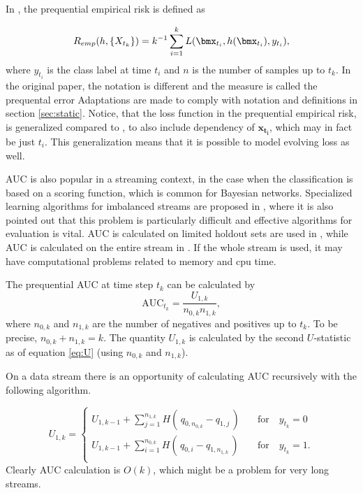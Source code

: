 In \cite{Gam13}, the prequential empirical risk is defined as 

\begin{equation}
\label{eq:prequentialRisk}
R_{emp}(h, \{X_{t_k}\}) = k^{-1} \sum_{i=1}^k L(\bmx_{t_i} , h(\bmx_{t_i} ), y_{t_i}),
\end{equation}
where $y_{t_i}$ is the class label at time $t_i$ and $n$ is the number of samples up to $t_k$.  In the original paper, the notation is different and the measure is called the prequental error  Adaptations are made to comply with notation and definitions in section \ref{sec:static}.  Notice, that the loss function in the prequential empirical risk, is generalized compared to \cite{Gam13}, to also include dependency of $\bm{x_{t_i}}$, which may in fact be just $t_i$.  This generalization means that it is possible to model evolving loss as well.


AUC is also popular in a streaming context, in the case when the classification is based on a scoring function, which is common for Bayesian networks. 
Specialized learning algorithms for imbalanced streams are proposed in \cite{Dit13, Hoe12, Lic10}, where it is also pointed out that this problem is particularly difficult and effective algorithms for evaluation is vital.  
AUC is calculated on limited holdout sets are used in  \cite{Dit13, Lic10}, while AUC is calculated on the entire stream in  \cite{Hoe12}. If the whole stream is used, it may have computational problems related to memory and cpu time.  

The prequential AUC at time step $t_k$ can be calculated by
\begin{equation}
\label{eq:prequentialAUC}
\mbox{AUC}_{t_k}= \frac{U_{1,k}}{n_{0,k}n_{1,k}},
\end{equation}
where $n_{0,k}$ and $n_{1,k}$ are the number of negatives and positives up to $t_k$.  To be precise, $n_{0,k} + n_{1,k} = k$.  The quantity $U_{1,k}$ is calculated by the second $U$-statistic as of equation \eqref{eq:U} (using $n_{0,k}$ and $n_{1,k}$).

On a data stream there is an opportunity of calculating AUC recursively with the following algorithm.

\begin{equation}
\label{eq:prequentialAUC2}
U_{1,k}= 
\begin{cases}
U_{1,k-1} + \sum_{j=1}^{n_{1,k}} H( \,q_{0,n_{0,k}} - q_{1,j}    \,)
 \quad &\mbox{for} \quad y_{t_k} = 0\\
U_{1,k-1} + \sum_{i=1}^{n_{0,k}} H( \,q_{0,i} - q_{1,n_{1,k}}    \,)
\quad &\mbox{for} \quad y_{t_k} = 1.\\
\end{cases}
\end{equation}
Clearly AUC calculation is $O(k)$, which might be a problem for very long streams.  

